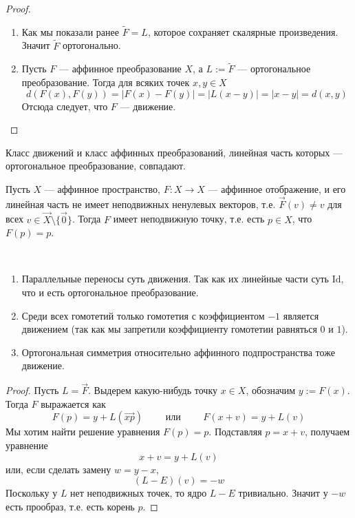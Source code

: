 \documentclass[12pt,a4paper]{article}
\newcommand{\Id}{\ensuremath{\mathrm{Id}}\xspace}
\begin{document}
\begin{proof}
\begin{enumerate}
            \item Как мы показали ранее $\widetilde{F} = L$, которое сохраняет скалярные произведения. Значит $\widetilde{F}$ ортогонально.
            
            \item Пусть $F$ --- аффинное преобразование $X$, а $L := \widetilde{F}$ --- ортогональное преобразование. Тогда для всяких точек $x, y \in X$
                \[d(F(x), F(y)) = |F(x) - F(y)| = |L(x - y)| = |x - y| = d(x, y)\]
                Отсюда следует, что $F$ --- движение.
        \end{enumerate}
    \end{proof}

    \begin{corollary}
        Класс движений и класс аффинных преобразований, линейная часть которых --- ортогональное преобразование, совпадают.
    \end{corollary}

    \begin{lemma}
        Пусть $X$ --- аффинное пространство, $F: X \to X$ --- аффинное отображение, и его линейная часть не имеет неподвижных ненулевых векторов, т.е. $\overrightarrow{F}(v) \neq v$ для всех $v \in \overrightarrow{X} \setminus \{\vec{0}\}$. Тогда $F$ имеет неподвижную точку, т.е. есть $p \in X$, что $F(p) = p$.
    \end{lemma}

    \begin{example}\ 
        \begin{enumerate}
            \item Параллельные переносы суть движения. Так как их линейные части суть $\Id$, что и есть ортогональное преобразование.
            \item Среди всех гомотетий только гомотетия с коэффициентом $-1$ является движением (так как мы запретили коэффициенту гомотетии равняться $0$ и $1$).
            \item Ортогональная симметрия относительно аффинного подпространства тоже движение.
        \end{enumerate}
    \end{example}

    \begin{proof}
        Пусть $L = \overrightarrow{F}$. Выдерем какую-нибудь точку $x \in X$, обозначим $y := F(x)$. Тогда $F$ выражается как
        \[
            F(p) = y + L(\overrightarrow{xp})
            \qquad \text{ или } \qquad
            F(x + v) = y + L(v)
        \]
        Мы хотим найти решение уравнения $F(p) = p$. Подставляя $p = x + v$, получаем уравнение
        \[x + v = y + L(v)\]
        или, если сделать замену $w = y - x$,
        \[(L - E)(v) = -w\]
        Поскольку у $L$ нет неподвижных точек, то ядро $L-E$ тривиально. Значит у $-w$ есть прообраз, т.е. есть корень $p$. 
    \end{proof}
\end{document}
